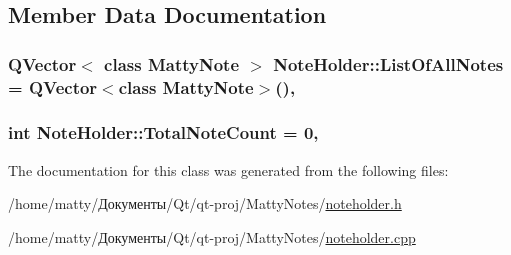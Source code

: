 \subsection{Member Data Documentation}
\subsubsection[{\texorpdfstring{List\+Of\+All\+Notes}{ListOfAllNotes}}]{\setlength{\rightskip}{0pt plus 5cm}Q\+Vector$<$ class {\bf Matty\+Note} $>$ Note\+Holder\+::\+List\+Of\+All\+Notes = Q\+Vector$<$class {\bf Matty\+Note}$>$()\hspace{0.3cm}{\ttfamily [static]}, {\ttfamily [private]}}\hypertarget{class_note_holder_aba93502b4bdb3358063a0433fe4def4f}{}\label{class_note_holder_aba93502b4bdb3358063a0433fe4def4f}
\subsubsection[{\texorpdfstring{Total\+Note\+Count}{TotalNoteCount}}]{\setlength{\rightskip}{0pt plus 5cm}int Note\+Holder\+::\+Total\+Note\+Count = 0\hspace{0.3cm}{\ttfamily [static]}, {\ttfamily [private]}}\hypertarget{class_note_holder_aeb685924427caabb7087ef7cf743c913}{}\label{class_note_holder_aeb685924427caabb7087ef7cf743c913}


The documentation for this class was generated from the following files\+:\begin{DoxyCompactItemize}
\item 
/home/matty/Документы/\+Qt/qt-\/proj/\+Matty\+Notes/\hyperlink{noteholder_8h}{noteholder.\+h}\item 
/home/matty/Документы/\+Qt/qt-\/proj/\+Matty\+Notes/\hyperlink{noteholder_8cpp}{noteholder.\+cpp}\end{DoxyCompactItemize}
